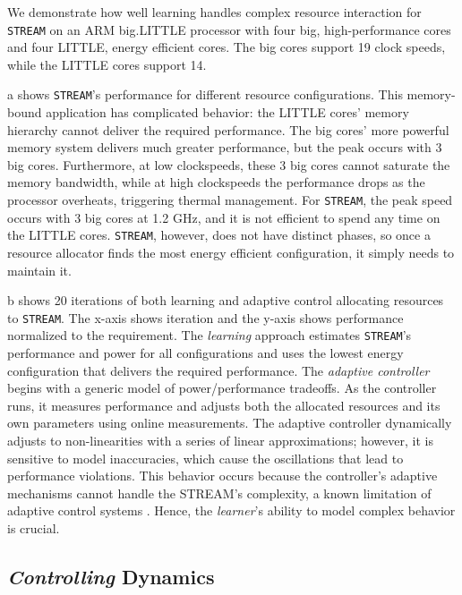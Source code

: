 We demonstrate how well learning handles complex resource interaction
for \texttt{STREAM} on an ARM big.LITTLE processor with four big,
high-performance cores and four LITTLE, energy efficient cores.  The
big cores support 19 clock speeds, while the LITTLE cores support 14.


a shows \texttt{STREAM}'s performance for
different resource configurations.  This memory-bound application has
complicated behavior: the LITTLE cores' memory hierarchy cannot
deliver the required performance.  The big cores' more powerful memory
system delivers much greater performance, but the peak occurs with 3
big cores.  Furthermore, at low clockspeeds, these 3 big cores cannot
saturate the memory bandwidth, while at high clockspeeds the
performance drops as the processor overheats, triggering thermal
management.  For \texttt{STREAM}, the peak speed occurs with 3 big
cores at 1.2 GHz, and it is not efficient to spend any time on the
LITTLE cores.  \texttt{STREAM}, however, does not have distinct
phases, so once a resource allocator finds the most energy efficient
configuration, it simply needs to maintain it.


b shows 20 iterations of both learning
\cite{LEO} and adaptive control \cite{POET} allocating resources to
\texttt{STREAM}.  The x-axis shows iteration and the y-axis shows
performance normalized to the requirement.  The \emph{learning}
approach estimates \texttt{STREAM}'s performance and power for all
configurations and uses the lowest energy configuration that delivers
the required performance.  The \emph{adaptive controller} begins with
a generic model of power/performance tradeoffs.  As the controller
runs, it measures performance and adjusts both the allocated resources
and its own parameters using online measurements.  The adaptive
controller dynamically adjusts to non-linearities with a series of
linear approximations; however, it is sensitive to model inaccuracies,
which cause the oscillations that lead to performance violations.
This behavior occurs because the controller's adaptive mechanisms
cannot handle the STREAM's complexity, a known limitation of adaptive
control systems \cite{ControlWare,POET,ICSE2014}.  Hence, the
\emph{learner}'s ability to model complex behavior is crucial.

\subsection{\emph{Controlling} Dynamics}

